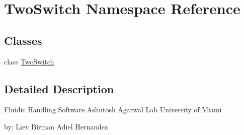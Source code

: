 \hypertarget{namespace_two_switch}{}\section{Two\+Switch Namespace Reference}
\label{namespace_two_switch}
\subsection*{Classes}
\begin{DoxyCompactItemize}
\item 
class \mbox{\hyperlink{class_two_switch_1_1_two_switch}{Two\+Switch}}
\end{DoxyCompactItemize}


\subsection{Detailed Description}
\begin{DoxyVerb}Fluidic Handling Software
Ashutosh Agarwal Lab
University of Miami

by:
Liev Birman
Adiel Hernandez
\end{DoxyVerb}
 